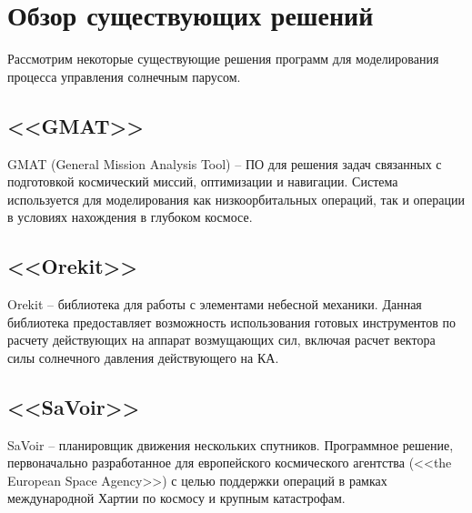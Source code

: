 \chapter{Обзор существующих решений}
\noindent\indent Рассмотрим некоторые существующие решения программ для моделирования
процесса управления солнечным парусом.
\section{<<GMAT>>}
\noindent\indent GMAT (General Mission Analysis Tool) -- ПО для решения задач связанных
с подготовкой космический миссий, оптимизации и навигации. Система используется для
моделирования как низкоорбитальных операций, так и операции в условиях нахождения
в глубоком космосе.
\section{<<Orekit>>}
\noindent\indent Orekit -- библиотека для работы с элементами небесной механики.
Данная библиотека предоставляет возможность использования готовых инструментов по расчету
действующих на аппарат возмущающих сил, включая расчет вектора силы солнечного давления
действующего на КА.
\section{<<SaVoir>>}
\noindent\indent SaVoir -- планировщик движения нескольких спутников. Программное
решение, первоначально разработанное для европейского космического агентства
(<<the European Space Agency>>) с целью поддержки операций в рамках международной
Хартии по космосу и крупным катастрофам.

